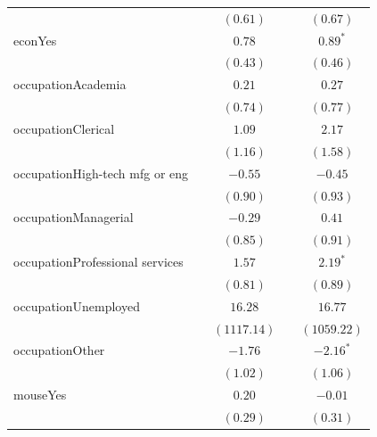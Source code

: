\documentclass[
  12,
  letterpaper,
  DIV=11,
  numbers=noendperiod]{scrartcl}
\begin{document}
\begin{table}
{\begin{center}
\begin{tabular}{l c c c c}
                                &               & $(0.61)$      &               & $(0.67)$      \\
econYes                         &               & $0.78$        &               & $0.89^{*}$    \\
                                &               & $(0.43)$      &               & $(0.46)$      \\
occupationAcademia              &               & $0.21$        &               & $0.27$        \\
                                &               & $(0.74)$      &               & $(0.77)$      \\
occupationClerical              &               & $1.09$        &               & $2.17$        \\
                                &               & $(1.16)$      &               & $(1.58)$      \\
occupationHigh-tech mfg or eng  &               & $-0.55$       &               & $-0.45$       \\
                                &               & $(0.90)$      &               & $(0.93)$      \\
occupationManagerial            &               & $-0.29$       &               & $0.41$        \\
                                &               & $(0.85)$      &               & $(0.91)$      \\
occupationProfessional services &               & $1.57$        &               & $2.19^{*}$    \\
                                &               & $(0.81)$      &               & $(0.89)$      \\
occupationUnemployed            &               & $16.28$       &               & $16.77$       \\
                                &               & $(1117.14)$   &               & $(1059.22)$   \\
occupationOther                 &               & $-1.76$       &               & $-2.16^{*}$   \\
                                &               & $(1.02)$      &               & $(1.06)$      \\
mouseYes                        &               & $0.20$        &               & $-0.01$       \\
                                &               & $(0.29)$      &               & $(0.31)$      \\

\end{tabular}
\end{center}}
\end{table}
\end{document}
